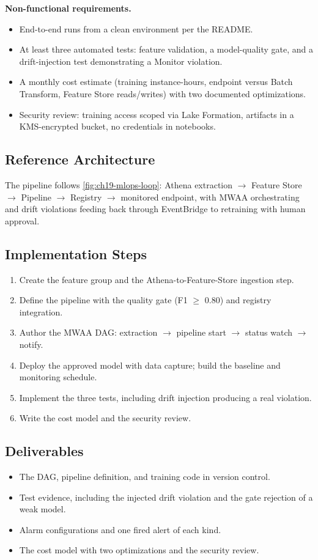 \textbf{Non-functional requirements.}
\begin{itemize}
    \item End-to-end runs from a clean environment per the README.
    \item At least three automated tests: feature validation, a model-quality gate, and a drift-injection test demonstrating a Monitor violation.
    \item A monthly cost estimate (training instance-hours, endpoint versus Batch Transform, Feature Store reads/writes) with two documented optimizations.
    \item Security review: training access scoped via Lake Formation, artifacts in a KMS-encrypted bucket, no credentials in notebooks.
\end{itemize}

\subsection*{Reference Architecture}
The pipeline follows \cref{fig:ch19-mlops-loop}: Athena extraction $\rightarrow$ Feature Store $\rightarrow$ Pipeline $\rightarrow$ Registry $\rightarrow$ monitored endpoint, with MWAA orchestrating and drift violations feeding back through EventBridge to retraining with human approval.

\subsection*{Implementation Steps}
\begin{enumerate}
    \item Create the feature group and the Athena-to-Feature-Store ingestion step.
    \item Define the pipeline with the quality gate (F1 $\geq$ 0.80) and registry integration.
    \item Author the MWAA DAG: extraction $\rightarrow$ pipeline start $\rightarrow$ status watch $\rightarrow$ notify.
    \item Deploy the approved model with data capture; build the baseline and monitoring schedule.
    \item Implement the three tests, including drift injection producing a real violation.
    \item Write the cost model and the security review.
\end{enumerate}

\subsection*{Deliverables}
\begin{itemize}
    \item The DAG, pipeline definition, and training code in version control.
    \item Test evidence, including the injected drift violation and the gate rejection of a weak model.
    \item Alarm configurations and one fired alert of each kind.
    \item The cost model with two optimizations and the security review.
\end{itemize}

